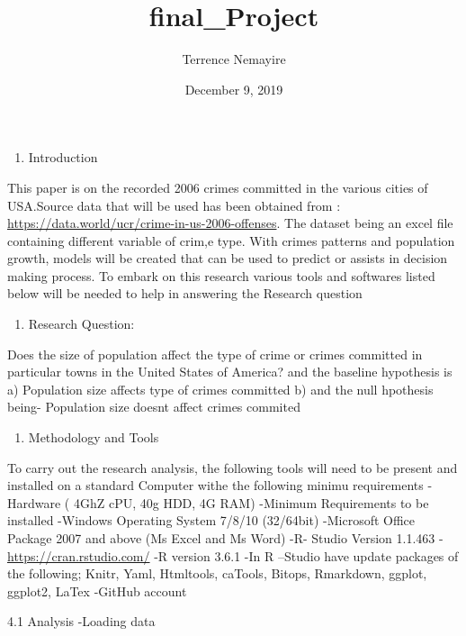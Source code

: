\documentclass[]{article}
\title{final\_Project}
\author{Terrence Nemayire}
\date{December 9, 2019}
\providecommand{\tightlist}{%
  \setlength{\itemsep}{0pt}\setlength{\parskip}{0pt}}
\begin{document}
\maketitle

\begin{enumerate}
\def\labelenumi{\arabic{enumi}.}
\tightlist
\item
  Introduction
\end{enumerate}

This paper is on the recorded 2006 crimes committed in the various
cities of USA.Source data that will be used has been obtained from :
\url{https://data.world/ucr/crime-in-us-2006-offenses}. The dataset
being an excel file containing different variable of crim,e type. With
crimes patterns and population growth, models will be created that can
be used to predict or assists in decision making process. To embark on
this research various tools and softwares listed below will be needed to
help in answering the Research question

\begin{enumerate}
\def\labelenumi{\arabic{enumi}.}
\setcounter{enumi}{1}
\tightlist
\item
  Research Question:
\end{enumerate}

Does the size of population affect the type of crime or crimes committed
in particular towns in the United States of America? and the baseline
hypothesis is a) Population size affects type of crimes committed b) and
the null hpothesis being- Population size doesnt affect crimes commited

\begin{enumerate}
\def\labelenumi{\arabic{enumi}.}
\setcounter{enumi}{2}
\tightlist
\item
  Methodology and Tools
\end{enumerate}

To carry out the research analysis, the following tools will need to be
present and installed on a standard Computer withe the following minimu
requirements -Hardware ( 4GhZ cPU, 40g HDD, 4G RAM) -Minimum
Requirements to be installed -Windows Operating System 7/8/10 (32/64bit)
-Microsoft Office Package 2007 and above (Ms Excel and Ms Word) -R-
Studio Version 1.1.463 - \url{https://cran.rstudio.com/} -R version
3.6.1 -In R --Studio have update packages of the following; Knitr, Yaml,
Htmltools, caTools, Bitops, Rmarkdown, ggplot, ggplot2, LaTex -GitHub
account

4.1 Analysis -Loading data
\end{document}
